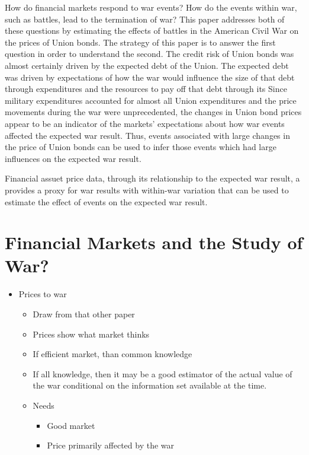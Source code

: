 How do financial markets respond to war events?
How do the events within war, such as battles, lead to the termination of war?
This paper addresses both of these questions by estimating the effects of battles in the American Civil War on the prices of Union bonds.
The strategy of this paper is to answer the first question in order to understand the second.
The credit risk of Union bonds was almost certainly driven by the expected debt of the Union.
The expected debt was driven by expectations of how the war would influence the size of that debt through expenditures and the resources to pay off that debt through its
Since military expenditures accounted for almost all Union expenditures and the price movements during the war were unprecedented, the changes in Union bond prices appear to be an indicator of the markets' expectations about how war events affected the expected war result.
Thus, events associated with large changes in the price of Union bonds can be used to infer those events which had large influences on the expected war result.

Financial assuet price data, through its relationship to the expected war result, a provides a proxy for war results with within-war variation that can be used to estimate the effect of events on the expected war result.



\section{Financial Markets and the Study of War?}
\label{sec:barg-theory-war}

\begin{itemize}
\item Prices to war
  \begin{itemize}
  \item Draw from that other paper
  \item Prices show what market thinks
  \item If efficient market, than common knowledge
  \item If all knowledge, then it may be a good estimator of the actual value of the war conditional on the information set available at the time.
  \item Needs
    \begin{itemize}
    \item Good market
    \item Price primarily affected by the war
    \end{itemize}
  \end{itemize}
\end{itemize}



